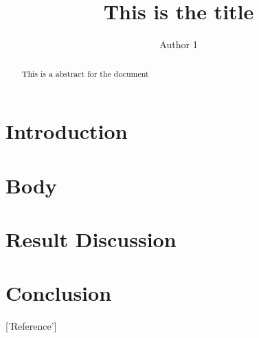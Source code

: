 

\title{This is the title}
\author{Author 1}



\maketitle

\begin{abstract}
    This is a abstract for the document
\end{abstract}

\section{Introduction}

\section{Body}

\section{Result Discussion}

\section{Conclusion}

['Reference']
\printbibliography

